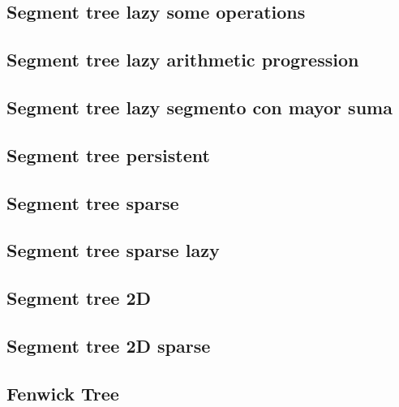 \subsection{Segment tree lazy some operations}
\raggedbottom
\hrulefill
\subsection{Segment tree lazy arithmetic progression}
\raggedbottom
\hrulefill
\subsection{Segment tree lazy segmento con mayor suma}
\raggedbottom
\hrulefill
\subsection{Segment tree persistent}
\raggedbottom
\hrulefill
\subsection{Segment tree sparse}
\raggedbottom
\hrulefill
\subsection{Segment tree sparse lazy}
\raggedbottom
\hrulefill
\subsection{Segment tree 2D}
\raggedbottom
\hrulefill
\subsection{Segment tree 2D sparse}
\raggedbottom
\hrulefill
\subsection{Fenwick Tree}
\raggedbottom
\hrulefill
